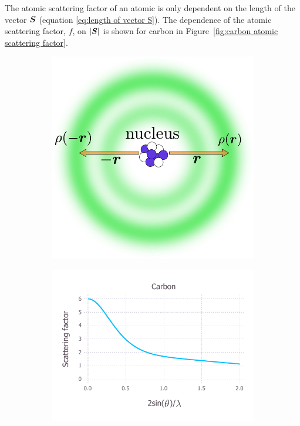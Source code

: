             The atomic scattering factor of an atomic is only dependent on the length of the vector $\boldsymbol{S}$ (equation \ref{eq:length of vector S}).
            The dependence of the atomic scattering factor, $f$, on $|\boldsymbol{S}|$ is shown for carbon in Figure~\ref{fig:carbon atomic scattering factor}.

            \begin{figure}
                \centering
                \begin{subfigure}[b]{0.4\textwidth}
                        \centering
                        \includegraphics[width=\textwidth]{figures/introduction/atomicelectroncloud.pdf}
                        \caption{}
                        \label{fig:atomic electron cloud}
                \end{subfigure}
                \qquad
                \begin{subfigure}[b]{0.5\textwidth}
                        \centering
                        \includegraphics[width=\textwidth]{figures/introduction/carbonscatfac.pdf}

\end{subfigure}
\end{figure}
